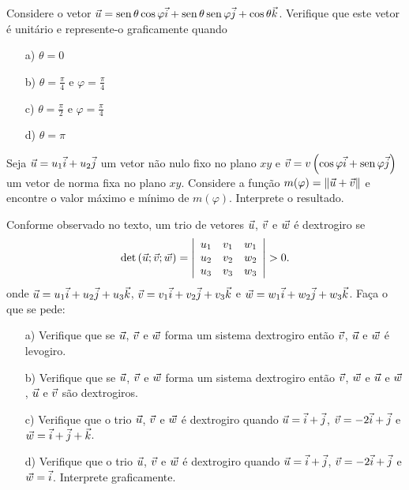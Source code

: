 \begin{prob} Considere o vetor $\vec{u}=\operatorname{sen}\theta \cos\varphi \vec{i}+ \operatorname{sen}\theta \operatorname{sen}\varphi \vec{j} + \cos\theta \vec{k}$. Verifique que este vetor é unitário e represente-o graficamente quando
\begin{itemize}
\item[a)] $\theta=0$
\item[b)] $\theta=\frac{\pi}{4}$ e $\varphi=\frac{\pi}{4}$
\item[c)] $\theta=\frac{\pi}{2}$ e $\varphi=\frac{\pi}{4}$
\item[d)] $\theta=\pi$

\end{itemize}
\end{prob}

\begin{prob}\label{probmaxmin} Seja $\vec{u}=u_1\vec{i} + u_2\vec{j}$ um vetor não nulo fixo no plano $xy$ e $\vec{v}=v\left(\cos\varphi \vec{i}+\operatorname{sen}\varphi \vec{j}\right)$ um vetor de norma fixa no plano $xy$. Considere a função $m(\varphi)=\|\vec{u}+\vec{v}\|$ e encontre o valor máximo e mínimo de $m(\varphi)$. Interprete o resultado.
\end{prob}

\begin{prob}\label{probdextro} Conforme observado no texto, um trio de vetores $\vec{u}$, $\vec{v}$ e $\vec{w}$ é dextrogiro se
\begin{equation*}
\det\left(\vct{u};\vct{v};\vct{w}\right)= \left|\begin{array}{ccc}
u_1&v_1&w_1\\
u_2&v_2&w_2\\
u_3&v_3&w_3
\end{array}
\right|>0.
\end{equation*}   
onde $\vec{u}=u_1\vec{i}+u_2\vec{j}+u_3\vec{k}$, $\vec{v}=v_1\vec{i}+v_2\vec{j}+v_3\vec{k}$ e $\vec{w}=w_1\vec{i}+w_2\vec{j}+w_3\vec{k}$. Faça o que se pede:
\begin{itemize}
\item [a)]Verifique que se $\vec{u}$, $\vec{v}$ e $\vec{w}$ forma um sistema dextrogiro então $\vec{v}$, $\vec{u}$ e $\vec{w}$ é levogiro.
\item [b)]Verifique que se $\vec{u}$, $\vec{v}$ e $\vec{w}$ forma um sistema dextrogiro então $\vec{v}$, $\vec{w}$ e $\vec{u}$ e $\vec{w}$, $\vec{u}$ e $\vec{v}$ são dextrogiros. 
\item [c)]Verifique que o trio $\vec{u}$, $\vec{v}$ e $\vec{w}$ é dextrogiro quando $\vec{u}=\vec{i}+\vec{j}$, $\vec{v}=-2\vec{i}+\vec{j}$ e $\vec{w}=\vec{i}+\vec{j}+\vec{k}$. 
\item [d)]Verifique que o trio $\vec{u}$, $\vec{v}$ e $\vec{w}$ é dextrogiro quando $\vec{u}=\vec{i}+\vec{j}$, $\vec{v}=-2\vec{i}+\vec{j}$ e $\vec{w}=\vec{i}$. Interprete graficamente.
\end{itemize}
\end{prob}

